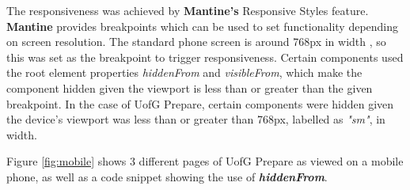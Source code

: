 \documentclass{l4proj}
\begin{document}
The responsiveness was achieved by \textbf{Mantine's} Responsive Styles feature. \textbf{Mantine} provides breakpoints which can be used to set functionality depending on screen resolution. The standard phone screen is around 768px in width \citep{BrowserStack_2023}, so this was set as the breakpoint to trigger responsiveness. Certain components used the root element properties \textit{hiddenFrom} and \textit{visibleFrom}, which make the component hidden given the viewport is less than or greater than the given breakpoint. In the case of UofG Prepare, certain components were hidden given the device's viewport was less than or greater than 768px, labelled as \textit{"sm"}, in width. 

Figure \ref{fig:mobile} shows 3 different pages of UofG Prepare as viewed on a mobile phone, as well as a code snippet showing the use of \textbf{\textit{hiddenFrom}}.
\end{document}
